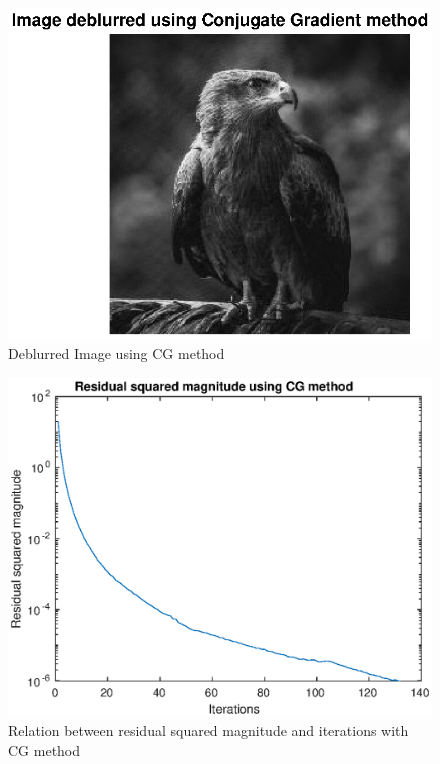 \documentclass[unicode,11pt,a4paper,oneside,numbers=endperiod,openany]{scrartcl}
\begin{document}
\begin{figure}[H]
    \centering
    \caption{Deblurred Image using CG method}
    \label{fig:ex4-3-deblurred-cg}
    \includegraphics[width=\textwidth, trim={0cm 0cm 0cm 0cm}, clip]{./figures/ex4-3-deblurred-cg.eps}
\end{figure}

\begin{figure}[H]
    \centering
    \caption{Relation between residual squared magnitude and iterations with CG method}
    \label{fig:ex4-4-residual-cg}
    \includegraphics[width=\textwidth, trim={0cm 0cm 0cm 0cm}, clip]{./figures/ex4-4-residual-cg.eps}
\end{figure}
\end{document}
